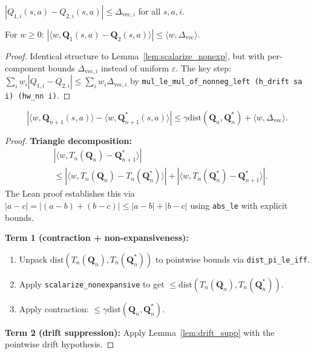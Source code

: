 \begin{definition}
$|Q_{1,i}(s,a) - Q_{2,i}(s,a)| \le \Delta_{\mathrm{vec},i}$ for all $s,a,i$.
\end{definition}

\begin{lemma}
\label{lem:drift_supp}
For $w \ge 0$: $|\langle w, \mathbf{Q}_1(s,a) - \mathbf{Q}_2(s,a) \rangle| \le \langle w, \Delta_{\mathrm{vec}} \rangle$.
\end{lemma}
\begin{proof}
Identical structure to Lemma~\ref{lem:scalarize_nonexp}, but with per-component bounds $\Delta_{\mathrm{vec},i}$ instead of uniform $\varepsilon$.  The key step: $\sum_i w_i |Q_{1,i} - Q_{2,i}| \le \sum_i w_i \Delta_{\mathrm{vec},i}$ by \texttt{mul\_le\_mul\_of\_nonneg\_left (h\_drift sa i) (hw\_nn i)}.
\end{proof}

\begin{theorem}
\begin{equation}
    |\langle w, \mathbf{Q}_{n+1}(s,a) \rangle - \langle w, \mathbf{Q}^*_{n+1}(s,a) \rangle| \le \gamma \mathrm{dist}(\mathbf{Q}_n, \mathbf{Q}^*_n) + \langle w, \Delta_{\mathrm{vec}} \rangle.
\end{equation}
\end{theorem}
\begin{proof}
\textbf{Triangle decomposition:}
\begin{align}
    &|\langle w, T_n(\mathbf{Q}_n) - \mathbf{Q}^*_{n+1} \rangle| \\
    &\le |\langle w, T_n(\mathbf{Q}_n) - T_n(\mathbf{Q}^*_n) \rangle| + |\langle w, T_n(\mathbf{Q}^*_n) - \mathbf{Q}^*_{n+1} \rangle|.
\end{align}
The Lean proof establishes this via $|a - c| = |(a - b) + (b - c)| \le |a - b| + |b - c|$ using \texttt{abs\_le} with explicit bounds.

\textbf{Term 1 (contraction + non-expansiveness):}
\begin{enumerate}
    \item Unpack $\mathrm{dist}(T_n(\mathbf{Q}_n), T_n(\mathbf{Q}^*_n))$ to pointwise bounds via \texttt{dist\_pi\_le\_iff}.
    \item Apply \texttt{scalarize\_nonexpansive} to get $\le \mathrm{dist}(T_n(\mathbf{Q}_n), T_n(\mathbf{Q}^*_n))$.
    \item Apply contraction: $\le \gamma \mathrm{dist}(\mathbf{Q}_n, \mathbf{Q}^*_n)$.
\end{enumerate}

\textbf{Term 2 (drift suppression):} Apply Lemma~\ref{lem:drift_supp} with the pointwise drift hypothesis.
\end{proof}


